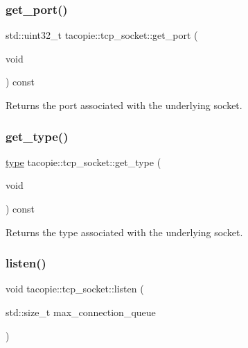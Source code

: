\subsubsection{\texorpdfstring{get\+\_\+port()}{get\_port()}}
{\footnotesize\ttfamily std\+::uint32\+\_\+t tacopie\+::tcp\+\_\+socket\+::get\+\_\+port (\begin{DoxyParamCaption}\item[{void}]{ }\end{DoxyParamCaption}) const}

\begin{DoxyReturn}{Returns}
the port associated with the underlying socket. 
\end{DoxyReturn}
\mbox{\label{classtacopie_1_1tcp__socket_a4f663be51b845520505bc20a88b411ee}} 
\subsubsection{\texorpdfstring{get\+\_\+type()}{get\_type()}}
{\footnotesize\ttfamily \hyperlink{classtacopie_1_1tcp__socket_ad8376e85df96ab9523f5d079ed7172ab}{type} tacopie\+::tcp\+\_\+socket\+::get\+\_\+type (\begin{DoxyParamCaption}\item[{void}]{ }\end{DoxyParamCaption}) const}

\begin{DoxyReturn}{Returns}
the type associated with the underlying socket. 
\end{DoxyReturn}
\mbox{\label{classtacopie_1_1tcp__socket_af0957ded2a84fb06d940cba98df477fb}} 
\subsubsection{\texorpdfstring{listen()}{listen()}}
{\footnotesize\ttfamily void tacopie\+::tcp\+\_\+socket\+::listen (\begin{DoxyParamCaption}\item[{std\+::size\+\_\+t}]{max\+\_\+connection\+\_\+queue }\end{DoxyParamCaption})}


